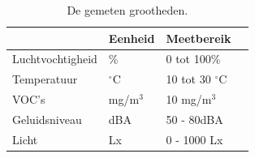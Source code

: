 \begin{table}[ht]
    \centering
    \begin{tabular}{l||l|l|l}
        & Eenheid & Meetbereik\\
        \hline
        Luchtvochtigheid & \%          & 0 tot 100\%           & \cite{palonen1993effects}  \\
        Temperatuur      & $^{\circ}$C & 10 tot 30 $^{\circ}$C & \cite{palonen1993effects}  \\
        VOC's            & mg/m\(^3\)  & 10 mg/m\(^3\)         & \cite{voc-luchtkwaliteit}  \\
        Geluidsniveau    & dBA         & 50 - 80dBA            & \cite{geluid-levels}       \\
        Licht            & Lx          & 0 - 1000 Lx           & \cite{lightingIndorWorkspaces}
    \end{tabular}
    \caption{De gemeten grootheden.}
    \label{tab:grootheden}
\end{table}

 